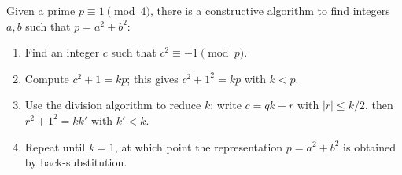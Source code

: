 Given a prime $p \equiv 1 \pmod{4}$, there is a constructive algorithm to find integers $a, b$ such that $p = a^2 + b^2$:
\begin{enumerate}
\item Find an integer $c$ such that $c^2 \equiv -1 \pmod{p}$.
\item Compute $c^2 + 1 = kp$; this gives $c^2 + 1^2 = kp$ with $k < p$.
\item Use the division algorithm to reduce $k$: write $c = qk + r$ with $|r| \leq k/2$, then $r^2 + 1^2 = kk'$ with $k' < k$.
\item Repeat until $k = 1$, at which point the representation $p = a^2 + b^2$ is obtained by back-substitution.
\end{enumerate}
